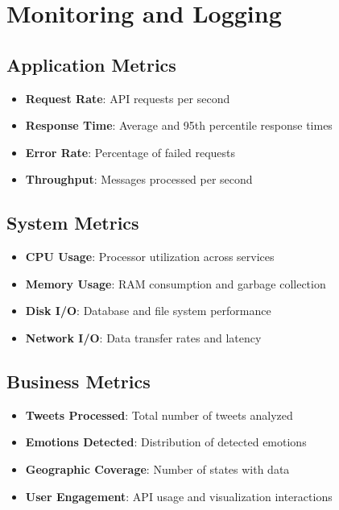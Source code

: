 
\section{Monitoring and Logging}

\subsection{Application Metrics}
\begin{itemize}
\item \textbf{Request Rate}: API requests per second
\item \textbf{Response Time}: Average and 95th percentile response times
\item \textbf{Error Rate}: Percentage of failed requests
\item \textbf{Throughput}: Messages processed per second
\end{itemize}

\subsection{System Metrics}
\begin{itemize}
\item \textbf{CPU Usage}: Processor utilization across services
\item \textbf{Memory Usage}: RAM consumption and garbage collection
\item \textbf{Disk I/O}: Database and file system performance
\item \textbf{Network I/O}: Data transfer rates and latency
\end{itemize}

\subsection{Business Metrics}
\begin{itemize}
\item \textbf{Tweets Processed}: Total number of tweets analyzed
\item \textbf{Emotions Detected}: Distribution of detected emotions
\item \textbf{Geographic Coverage}: Number of states with data
\item \textbf{User Engagement}: API usage and visualization interactions
\end{itemize}

